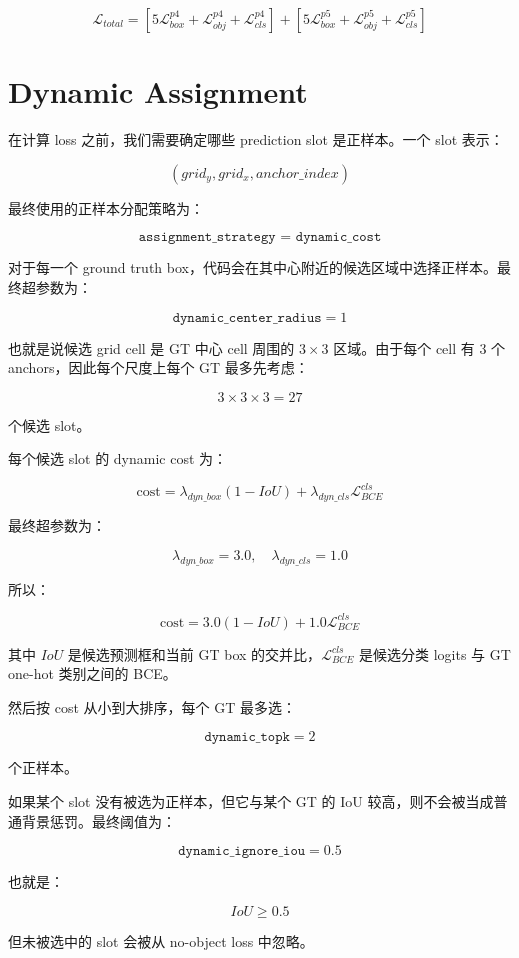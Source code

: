 \documentclass[UTF8,12pt]{ctexart}
\begin{document}
\[
\mathcal{L}_{total}
=
\left[
5\mathcal{L}_{box}^{p4}
+ \mathcal{L}_{obj}^{p4}
+ \mathcal{L}_{cls}^{p4}
\right]
+
\left[
5\mathcal{L}_{box}^{p5}
+ \mathcal{L}_{obj}^{p5}
+ \mathcal{L}_{cls}^{p5}
\right]
\]

\section{Dynamic Assignment}

在计算 loss 之前，我们需要确定哪些 prediction slot 是正样本。一个 slot 表示：

\[
(grid_y, grid_x, anchor\_index)
\]

最终使用的正样本分配策略为：

\[
\texttt{assignment\_strategy = dynamic\_cost}
\]

对于每一个 ground truth box，代码会在其中心附近的候选区域中选择正样本。最终超参数为：

\[
\texttt{dynamic\_center\_radius}=1
\]

也就是说候选 grid cell 是 GT 中心 cell 周围的 $3 \times 3$ 区域。由于每个 cell 有 3 个 anchors，因此每个尺度上每个 GT 最多先考虑：

\[
3 \times 3 \times 3 = 27
\]

个候选 slot。

每个候选 slot 的 dynamic cost 为：

\[
\text{cost}
= \lambda_{dyn\_box}(1 - IoU)
+ \lambda_{dyn\_cls}\mathcal{L}_{BCE}^{cls}
\]

最终超参数为：

\[
\lambda_{dyn\_box}=3.0,\quad
\lambda_{dyn\_cls}=1.0
\]

所以：

\[
\text{cost}
= 3.0(1 - IoU)
+ 1.0\mathcal{L}_{BCE}^{cls}
\]

其中 $IoU$ 是候选预测框和当前 GT box 的交并比，$\mathcal{L}_{BCE}^{cls}$ 是候选分类 logits 与 GT one-hot 类别之间的 BCE。

然后按 cost 从小到大排序，每个 GT 最多选：

\[
\texttt{dynamic\_topk}=2
\]

个正样本。

如果某个 slot 没有被选为正样本，但它与某个 GT 的 IoU 较高，则不会被当成普通背景惩罚。最终阈值为：

\[
\texttt{dynamic\_ignore\_iou}=0.5
\]

也就是：

\[
IoU \geq 0.5
\]

但未被选中的 slot 会被从 no-object loss 中忽略。
\end{document}
